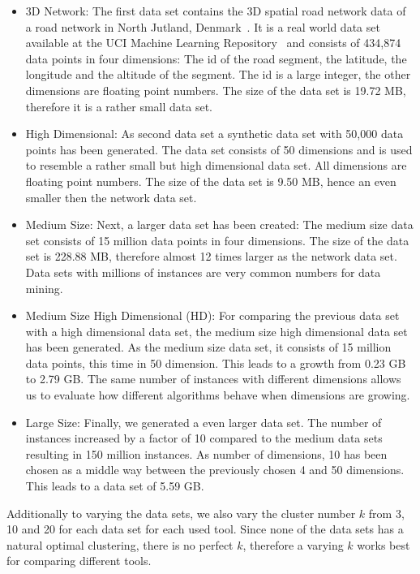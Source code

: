\begin{itemize} 
\item 3D Network: The first data set contains the 3D spatial road network data of a road network in North Jutland, Denmark~\parencite{3dnet}. It is a real world data set available at the UCI Machine Learning Repository~\parencite{frank2010uci} and consists of 434,874 data points in four dimensions: The id of the road segment, the latitude, the longitude and the altitude of the segment. The id is a large integer, the other dimensions are floating point numbers. The size of the data set is 19.72 MB, therefore it is a rather small data set.

\item High Dimensional: As second data set a synthetic data set with 50,000 data points has been generated. The data set consists of 50 dimensions and is used to resemble a rather small but high dimensional data set. All dimensions are floating point numbers. The size of the data set is 9.50 MB, hence an even smaller then the network data set.

\item Medium Size: Next, a larger data set has been created: The medium size data set consists of 15 million data points in four dimensions. The size of the data set is 228.88 MB, therefore almost 12 times larger as the network data set. Data sets with millions of instances are very common numbers for data mining.

\item Medium Size High Dimensional (HD): For comparing the previous data set with a high dimensional data set, the medium size high dimensional data set has been generated. As the medium size data set, it consists of 15 million data points, this time in 50 dimension. This leads to a growth from 0.23 GB to 2.79 GB. The same number of instances with different dimensions allows us to evaluate how different algorithms behave when dimensions are growing.

\item Large Size: Finally, we generated a even larger data set. The number of instances increased by a factor of 10 compared to the medium data sets resulting in 150 million instances. As number of dimensions, 10 has been chosen as a middle way between the previously chosen 4 and 50 dimensions. This leads to a data set of 5.59 GB.
\end{itemize} 

Additionally to varying the data sets, we also vary the cluster number $k$ from 3, 10 and 20 for each data set for each used tool. Since none of the data sets has a natural optimal clustering, there is no perfect $k$, therefore a varying $k$ works best for comparing different tools.


